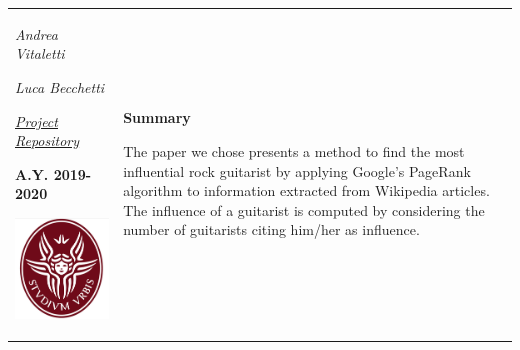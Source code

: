 \documentclass[12pt, twoside]{article}
\begin{document}
\begin{titlepage}
\begin{tabular}{p{6cm} p{10cm}}
\textrm{\textit{Andrea Vitaletti}}
\par\medskip
\textrm{\textit{Luca Becchetti}}

\vspace{15pt}
\href{https://github.com/LucaTomei/Computer_Scrientists}{\textit{\underline{Project Repository}}}

\vspace{2cm} 
\par\medskip
\begin{center}
\textbf{A.Y. 2019-2020}
\end{center}



\includegraphics[scale=0.4]{images/logo.png}
&

\textbf{Summary}	%
\par\medskip
The paper we chose presents a method to find the most influential rock guitarist by applying Google’s PageRank algorithm to information extracted from Wikipedia articles. The influence of a guitarist is computed by considering the number of guitarists citing him/her as influence.
\linebreak


\end{tabular}
\end{titlepage}
\end{document}
